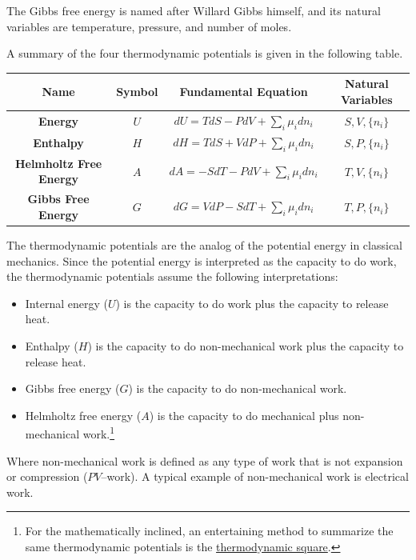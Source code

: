 \documentclass[
  9pt,
]{extbook}
\providecommand{\tightlist}{%
  \setlength{\itemsep}{0pt}\setlength{\parskip}{0pt}}
\theoremstyle{definition}
\theoremstyle{definition}
\theoremstyle{definition}
\theoremstyle{remark}
\begin{document}
The Gibbs free energy is named after Willard Gibbs himself, and its natural variables are temperature, pressure, and number of moles.

A summary of the four thermodynamic potentials is given in the following table.

\tiny

\begin{longtable}[]{@{}cccc@{}}
\toprule
\textbf{Name} & \textbf{Symbol} & \textbf{Fundamental Equation} & \textbf{Natural Variables} \\
\midrule
\endhead
\textbf{Energy} & \(U\) & \(dU=TdS-PdV+\sum_i\mu_i dn_i\) & \(S,V,\{n_i\}\) \\
\textbf{Enthalpy} & \(H\) & \(dH=TdS+VdP+\sum_i\mu_i dn_i\) & \(S,P,\{n_i\}\) \\
\textbf{Helmholtz Free Energy} & \(A\) & \(dA=-SdT-PdV+\sum_i\mu_i dn_i\) & \(T,V,\{n_i\}\) \\
\textbf{Gibbs Free Energy} & \(G\) & \(dG=VdP-SdT+\sum_i\mu_i dn_i\) & \(T,P,\{n_i\}\) \\
\bottomrule
\end{longtable}

\normalsize

The thermodynamic potentials are the analog of the potential energy in classical mechanics. Since the potential energy is interpreted as the capacity to do work, the thermodynamic potentials assume the following interpretations:

\begin{itemize}
\tightlist
\item
  Internal energy (\(U\)) is the capacity to do work plus the capacity to release heat.
\item
  Enthalpy (\(H\)) is the capacity to do non-mechanical work plus the capacity to release heat.
\item
  Gibbs free energy (\(G\)) is the capacity to do non-mechanical work.
\item
  Helmholtz free energy (\(A\)) is the capacity to do mechanical plus non-mechanical work.\footnote{For the mathematically inclined, an entertaining method to summarize the same thermodynamic potentials is the \href{https://en.wikipedia.org/wiki/Thermodynamic_square}{thermodynamic square}.}
\end{itemize}

Where non-mechanical work is defined as any type of work that is not expansion or compression (\(PV\)--work). A typical example of non-mechanical work is electrical work.
\end{document}
